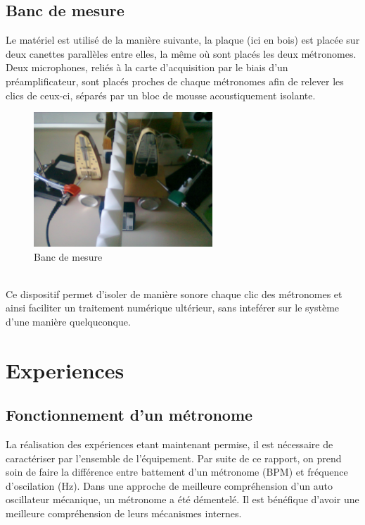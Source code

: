 \documentclass[a4paper,11pt]{report}
\begin{document}
\section{Banc de mesure}

Le matériel est utilisé de la manière suivante, la plaque (ici en bois) est placée sur deux canettes parallèles entre elles, la même où sont placés les deux métronomes. Deux microphones, reliés à la carte d'acquisition par le biais d'un préamplificateur, sont placés proches de chaque métronomes afin de relever les clics de ceux-ci, séparés par un bloc de mousse acoustiquement isolante.\\
\begin{figure}[h]
\centering
\includegraphics[width=0.6\textwidth]{BancMesure}
\caption{Banc de mesure}\label{Banc}
\end{figure}\\
Ce dispositif permet d'isoler de manière sonore chaque clic des métronomes et ainsi faciliter un traitement numérique ultérieur, sans inteférer sur le système d'une manière quelquconque.
\chapter{Experiences}
\section{Fonctionnement d'un métronome}
La réalisation des expériences etant maintenant permise, il est nécessaire de caractériser par l'ensemble de l'équipement. Par suite de ce rapport, on prend soin de faire la différence entre battement d'un métronome (BPM) et fréquence d'oscilation (Hz). Dans une approche de meilleure compréhension d'un auto oscillateur mécanique, un métronome a été démentelé. Il est bénéfique d'avoir une meilleure compréhension de leurs mécanismes internes.\\
\end{document}
